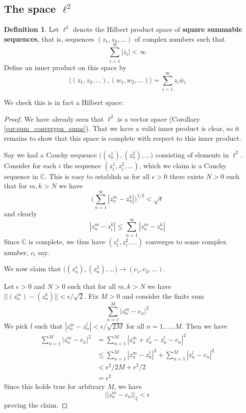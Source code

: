 \documentclass[12pt]{article}
\theoremstyle{plain}
\theoremstyle{definition}
\newtheorem{defn}[thm]{Definition} %
\newcommand{\bb}[1]{\mathbb{#1}}
\newcommand{\lto}{\longrightarrow}
\begin{document}
\subsection{The space $\ell^2$}
\begin{defn}
Let $\ell^2$ denote the Hilbert product space of \textbf{square summable sequences}, that is, sequences $(z_1,z_2,...)$ of complex numbers such that
\begin{equation}
\sum_{i = 1}^\infty |z_i| < \infty
\end{equation}
Define an inner product on this space by
\begin{equation}
\big\langle (z_1,z_2,...),(w_1,w_2,...)\big\rangle = \sum_{i = 1}^\infty z_i\bar{w}_i
\end{equation}
\end{defn}
We check this is in fact a Hilbert space:
\begin{proof}
We have already seen that $\ell^2$ is a vector space (Corollary \ref{cor:sum_convergen_sums}).  That we have a valid inner product is clear, so it remains to show that this space is complete with respect to this inner product.

Say we had a Cauchy sequence $\big((z_n^1),(z_n^2),...\big)$ consisting of elements in $\ell^2$.  Consider for each $i$ the sequence $(z_i^1,z_i^2,...)$, which we claim is a Cauchy sequence in $\bb{C}$. This is easy to establish as for all $\epsilon > 0$ there exists $N > 0$ such that for $m,k > N$ we have
\begin{equation}
\Big(\sum_{n = 1}^\infty|z_n^m - z_n^k|\Big)^{1/2} < \sqrt{\epsilon}
\end{equation}
and clearly
\begin{equation}
|z_n^m - z_i^k| \leq \sum_{n = 1}^\infty|z_n^m - z_n^k|
\end{equation}
Since $\bb{C}$ is complete, we thus have $(z_i^1,z_i^2,...)$ converges to some complex number, $c_i$ say.

We now claim that $\big((z_n^1),(z_n^2),...\big) \lto (c_1,c_2,...)$.

Let $\epsilon > 0$ and $N > 0$ such that for all $m,k > N$ we have $||(z_n^m) - (z_n^k)|| < \epsilon/\sqrt{2}$. Fix $M > 0$ and consider the finite sum
\begin{equation}
\sum_{n = 1}^M |z_n^m - c_n|^2
\end{equation}
We pick $l$ such that $|z_n^m - z_n^l| < \epsilon/\sqrt{2M}$ for all $n = 1,...,M$. Then we have
\begin{align*}
\sum_{n = 1}^M |z_n^m - c_n|^2 &= \sum_{n = 1}^M |z_n^m + z_n^l - z_n^l - c_n|^2\\
&\leq \sum_{n = 1}^M |z_n^m - z_n^l|^2 + \sum_{n = 1}^M |z_n^l - c_n|^2\\
&< \epsilon^2/2M + \epsilon^2/2\\
&= \epsilon^2
\end{align*}
Since this holds true for arbitrary $M$, we have
\begin{equation}
||z_n^m - c_n||_2 < \epsilon
\end{equation}
proving the claim.
\end{proof}
\end{document}
